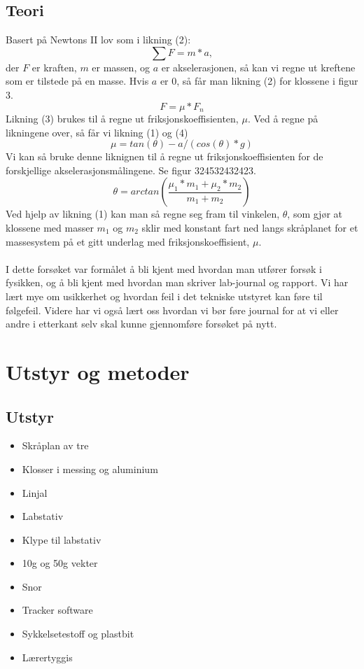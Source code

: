 \documentclass[10pt,a4paper]{report}
\begin{document}
\section*{Teori}
Basert på Newtons II lov som i likning (2): 
\begin{equation}
\sum{F} = m*a,
\end{equation} der $F$ er kraften, $m$ er massen, og $a$ er akselerasjonen, så kan vi regne ut kreftene som er tilstede på en masse. Hvis $a$ er 0, så får man likning (2) for klossene i figur 3. 
\begin{equation}
F = \mu *F_n
\end{equation}
Likning (3) brukes til å regne ut friksjonskoeffisienten, $\mu$. Ved å regne på likningene over, så får vi likning (1) og (4)
\begin{equation}
\mu = tan(\theta)-a/(cos(\theta)*g)
\end{equation}
Vi kan så bruke denne liknignen til å regne ut friksjonskoeffisienten for de forskjellige akselerasjonsmålingene. Se figur 324532432423. 
\begin{equation}
\theta = arctan(\frac{\mu_1*m_1+\mu_2*m_2}{m_1+m_2})
\end{equation}
Ved hjelp av likning (1) kan man så regne seg fram til vinkelen, $\theta$, som gjør at klossene med masser $m_1$ og $m_2$ sklir med konstant fart ned langs skråplanet for et massesystem på et gitt underlag med friksjonskoeffisient, $\mu$.\\
\\I dette forsøket var formålet å bli kjent med hvordan man utfører forsøk i fysikken, og å bli kjent med hvordan man skriver lab-journal og rapport. Vi har lært mye om usikkerhet og hvordan feil i det tekniske utstyret kan føre til følgefeil. Videre har vi også lært oss hvordan vi bør føre journal for at vi eller andre i etterkant selv skal kunne gjennomføre forsøket på nytt.

\chapter*{Utstyr og metoder}
\section*{Utstyr}
\begin{itemize}
\item Skråplan av tre
\item Klosser i messing og aluminium
\item Linjal
\item Labstativ
\item Klype til labstativ
\item 10g og 50g vekter
\item Snor
\item Tracker software
\item Sykkelsetestoff og plastbit
\item Lærertyggis
\end{itemize}
\end{document}
